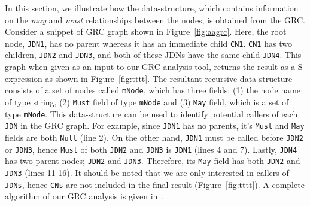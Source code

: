 In this section, we illustrate how the data-structure, which contains
information on the \textit{may} and \textit{must} relationships between
the nodes, is obtained from the GRC. Consider a snippet of GRC graph
shown in Figure~\ref{fig:aagrc}. Here, the root node, \texttt{JDN1}, has
no parent whereas it has an immediate child \texttt{CN1}. \texttt{CN1}
has two children, \texttt{JDN2} and \texttt{JDN3}, and both of these
JDNs have the same child \texttt{JDN4}. This graph when given as an
input to our GRC analysis tool, returns the result as a S-expression as
shown in Figure~\ref{fig:tttt}. The resultant recursive data-structure
consists of a set of nodes called \texttt{mNode}, which has three
fields: (1) the node name of type string, (2) \texttt{Must} field of
type \texttt{mNode} and (3) \texttt{May} field, which is a set of type
\texttt{mNode}. This data-structure can be used to identify potential
callers of each \texttt{JDN} in the GRC graph. For example, since
\texttt{JDN1} has no parents, it's \texttt{Must} and \texttt{May} fields
are both \texttt{Null} (line 2).  On the other hand, \texttt{JDN1} must
be called before \texttt{JDN2} or \texttt{JDN3}, hence \texttt{Must} of
both \texttt{JDN2} and \texttt{JDN3} is \texttt{JDN1} (lines 4 and 7).
Lastly, \texttt{JDN4} has two parent nodes; \texttt{JDN2} and
\texttt{JDN3}. Therefore, its \texttt{May} field has both \texttt{JDN2}
and \texttt{JDN3} (lines 11-16). It should be noted that we are only
interested in callers of \texttt{JDNs}, hence \texttt{CNs} are not
included in the final result (Figure~\ref{fig:tttt}). A complete
algorithm of our GRC analysis is given in~\cite{supp_amal02916}.







